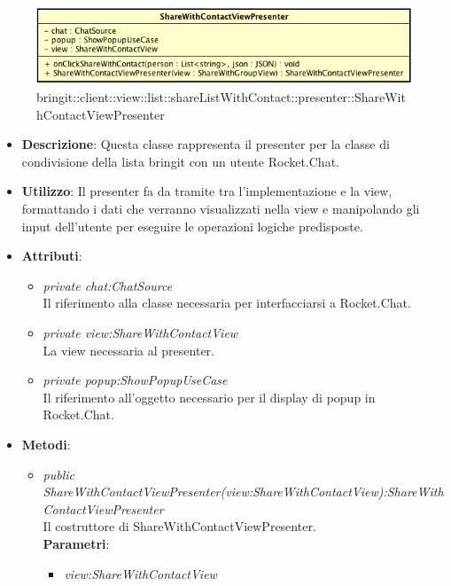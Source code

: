 \label{bringit::client::view::list::shareListWithContact::presenter::ShareWithContactViewPresenter}
\begin{figure}[H]
	\centering
	\includegraphics[scale=0.5]{Sezioni/SottosezioniST/img/app/ShareWithContactViewPresenter.png}
	\caption{bringit::client::view::list::shareListWithContact::presenter::ShareWithContactViewPresenter}
\end{figure}

\begin{itemize}
\item \textbf{Descrizione}: Questa classe rappresenta il presenter per la classe di condivisione della lista bringit con un utente Rocket.Chat.
\item \textbf{Utilizzo}: Il presenter fa da tramite tra l'implementazione e la view, formattando i dati che verranno visualizzati nella view e manipolando gli input dell'utente per eseguire le operazioni logiche predisposte.
\item \textbf{Attributi}: 
	\begin{itemize}
	\item \textit{private chat:ChatSource}\\
	Il riferimento alla classe necessaria per interfacciarsi a Rocket.Chat.
	\item \textit{private view:ShareWithContactView}\\
	La view necessaria al presenter.
	\item \textit{private popup:ShowPopupUseCase}\\
	Il riferimento all'oggetto necessario per il display di popup in Rocket.Chat.
	\end{itemize}
\item \textbf{Metodi}:
	\begin{itemize}
	\item \textit{public ShareWithContactViewPresenter(view:ShareWithContactView):ShareWithContactViewPresenter}\\
	Il costruttore di ShareWithContactViewPresenter.
					\\ \textbf{Parametri}: \begin{itemize}
			\item \textit{view:ShareWithContactView}\\

\end{itemize}
\end{itemize}
\end{itemize}
